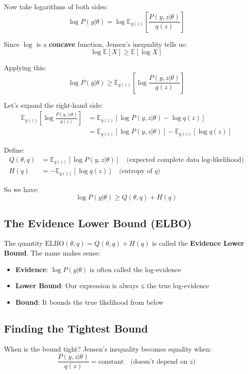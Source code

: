 \begin{notechapter}
Now take logarithms of both sides:
\[
\log P(y|\theta) = \log \mathbb{E}_{q(z)}\left[\frac{P(y,z|\theta)}{q(z)}\right]
\]

Since $\log$ is a \textbf{concave} function, Jensen's inequality tells us:
\[
\log \mathbb{E}[X] \geq \mathbb{E}[\log X]
\]

Applying this:
\[
\log P(y|\theta) \geq \mathbb{E}_{q(z)}\left[\log\frac{P(y,z|\theta)}{q(z)}\right]
\]

Let's expand the right-hand side:
\begin{align*}
\mathbb{E}_{q(z)}\left[\log\frac{P(y,z|\theta)}{q(z)}\right] 
&= \mathbb{E}_{q(z)}\left[\log P(y,z|\theta) - \log q(z)\right] \\
&= \mathbb{E}_{q(z)}\left[\log P(y,z|\theta)\right] - \mathbb{E}_{q(z)}\left[\log q(z)\right]
\end{align*}

Define:
\begin{align*}
Q(\theta, q) &= \mathbb{E}_{q(z)}\left[\log P(y,z|\theta)\right] \quad \text{(expected complete data log-likelihood)} \\
H(q) &= -\mathbb{E}_{q(z)}\left[\log q(z)\right] \quad \text{(entropy of $q$)}
\end{align*}

So we have:
\[
\log P(y|\theta) \geq Q(\theta, q) + H(q)
\]

\subsection{The Evidence Lower Bound (ELBO)}

The quantity $\text{ELBO}(\theta, q) = Q(\theta, q) + H(q)$ is called the \textbf{Evidence Lower Bound}. The name makes sense:
\begin{itemize}
    \item \textbf{Evidence}: $\log P(y|\theta)$ is often called the log-evidence
    \item \textbf{Lower Bound}: Our expression is always ≤ the true log-evidence
    \item \textbf{Bound}: It bounds the true likelihood from below
\end{itemize}

\subsection{Finding the Tightest Bound}

When is the bound tight? Jensen's inequality becomes equality when:
\[
\frac{P(y,z|\theta)}{q(z)} = \text{constant} \quad \text{(doesn't depend on $z$)}
\]


\end{notechapter}

